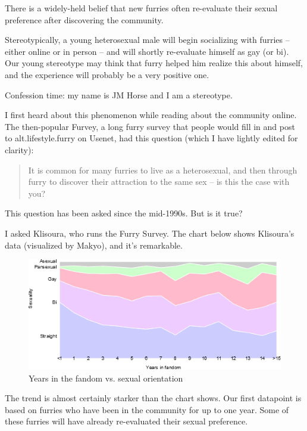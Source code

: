 
There is a widely-held belief that new furries often re-evaluate their sexual preference after discovering the community.

Stereotypically, a young heterosexual male will begin socializing with furries -- either online or in person -- and will shortly re-evaluate himself as gay (or bi). Our young stereotype may think that furry helped him realize this about himself, and the experience will probably be a very positive one.

Confession time: my name is JM Horse and I am a stereotype.

I first heard about this phenomenon while reading about the community online. The then-popular Furvey, a long furry survey that people would fill in and post to alt.lifestyle.furry on Usenet, had this question (which I have lightly edited for clarity):

\begin{quote}
It is common for many furries to live as a heterosexual, and then through furry to discover their attraction to the same sex -- is this the case with you?
 \end{quote}

This question has been asked since the mid-1990s. But is it true?

I asked Klisoura, who runs the Furry Survey. The chart below shows Klisoura’s data (visualized by Makyo), and it’s remarkable.

\begin{figure}
  \begin{center}
    \includegraphics[width=\textwidth]{content/assets/re-evaluating-sexuality--y-o}
  \end{center}
  \caption{Years in the fandom vs. sexual orientation}
\end{figure}

The trend is almost certainly starker than the chart shows. Our first datapoint is based on furries who have been in the community for up to one year. Some of these furries will have already re-evaluated their sexual preference.

